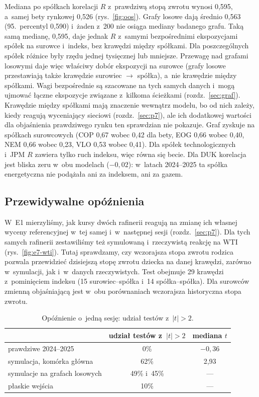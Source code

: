 \documentclass[11pt,a4paper]{article}
\begin{document}
Mediana po spółkach korelacji $R$ z~prawdziwą stopą zwrotu wynosi 0,595, a~samej bety rynkowej 0,526
(rys.~\ref{fig:oos}). Grafy
losowe dają średnio 0,563 (95.~percentyl 0,590) i~żaden z~200 nie osiąga mediany badanego grafu. Taką samą medianę,
0,595, daje jednak $R$ z~samymi bezpośrednimi ekspozycjami spółek na surowce i~indeks, bez krawędzi między
spółkami. Dla poszczególnych spółek różnice były rzędu jednej tysięcznej lub mniejsze. Przewagę nad grafami losowymi daje więc
właściwy dobór ekspozycji na surowce (grafy losowe przestawiają także krawędzie surowiec $\to$ spółka), a~nie
krawędzie między spółkami. Wagi bezpośrednie są szacowane na tych samych danych i~mogą ujmować łączne ekspozycje związane z~kilkoma ścieżkami (rozdz.~\ref{sec:graf}). Krawędzie między spółkami mają znaczenie wewnątrz modelu, bo od nich
zależy, kiedy reagują wyceniający sieciowi (rozdz.~\ref{sec:p7}), ale ich dodatkowej wartości dla objaśnienia
prawdziwego rynku ten sprawdzian nie pokazuje. Graf zyskuje na spółkach surowcowych (COP 0,67 wobec 0,42 dla bety, EOG 0,66 wobec 0,40, NEM 0,66 wobec 0,23, VLO 0,53 wobec
0,41). Dla spółek technologicznych i~JPM $R$ zawiera tylko ruch indeksu, więc równa się becie. Dla DUK korelacja
jest bliska zeru w~obu modelach ($-0{,}02$): w~latach 2024--2025 ta spółka energetyczna nie podążała ani za
indeksem, ani za gazem.

\subsection{Przewidywalne opóźnienia}\label{sec:opoznienia}
W~E1 mierzyliśmy, jak kursy dwóch rafinerii reagują na zmianę ich własnej wyceny referencyjnej w~tej samej
i~w~następnej sesji (rozdz.~\ref{sec:p7}). Dla tych samych rafinerii zestawiliśmy też symulowaną i~rzeczywistą
reakcję na WTI (rys.~\ref{fig:e7-wti}). Tutaj sprawdzamy, czy wczorajsza stopa zwrotu rodzica pozwala przewidzieć
dzisiejszą stopę zwrotu dziecka na danej krawędzi, zarówno w~symulacji, jak i~w~danych rzeczywistych.
Test obejmuje 29 krawędzi z~pominięciem indeksu (15 surowiec--spółka i~14 spółka--spółka). Dla surowców
zmienną objaśniającą jest w~obu porównaniach wczorajsza historyczna stopa zwrotu.

\begin{table}[!htbp]
\centering\small
\caption{Opóźnienie o~jedną sesję: udział testów z~$|t| > 2$.}\label{tab:lag}
\begin{tabular}{@{}l c c@{}}
\toprule
 & udział testów z~$|t| > 2$ & mediana $t$ \\
\midrule
prawdziwe 2024--2025 & 0\% & $-0{,}36$ \\
symulacja, komórka główna & 62\% & 2,93 \\
symulacje na grafach losowych & 49\% i~45\% & --- \\
płaskie wejścia & 10\% & --- \\
\bottomrule
\end{tabular}
\end{table}
\end{document}
